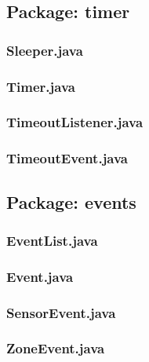 
\subsection{Package: timer}
\subsubsection{Sleeper.java}

\subsubsection{Timer.java}

\subsubsection{TimeoutListener.java}

\subsubsection{TimeoutEvent.java}


\subsection{Package: events}
\subsubsection{EventList.java}

\subsubsection{Event.java}

\subsubsection{SensorEvent.java}

\subsubsection{ZoneEvent.java}

